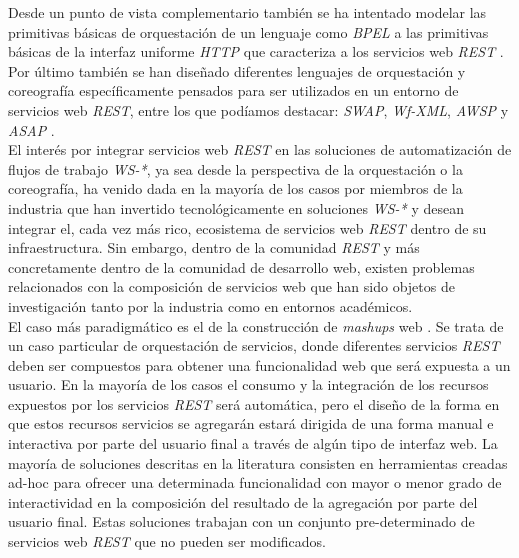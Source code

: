Desde un punto de vista complementario tambi\'en se ha intentado modelar las primitivas b\'asicas de orquestaci\'on de un lenguaje como \textit{BPEL} a las primitivas b\'asicas de la interfaz uniforme \textit{HTTP} que caracteriza a los servicios web \textit{REST} \cite{pautasso2010restful}.\\
Por \'ultimo tambi\'en se han dise\~nado diferentes lenguajes de orquestaci\'on y coreograf\'ia espec\'ificamente pensados para ser utilizados en un entorno de servicios web \textit{REST}, entre los que pod\'iamos destacar: \textit{SWAP}, \textit{Wf-XML}, \textit{AWSP} y \textit{ASAP} \cite{zur2005developing}.\\
El inter\'es por integrar servicios web \textit{REST} en las soluciones de automatizaci\'on de flujos de trabajo \textit{WS-*}, ya sea desde la perspectiva de la orquestaci\'on o la coreograf\'ia, ha venido dada en la mayor\'ia de los casos por miembros de la industria que han invertido tecnol\'ogicamente en soluciones \textit{WS-*} y desean integrar el, cada vez m\'as rico, ecosistema de servicios web \textit{REST} dentro de su infraestructura. Sin embargo, dentro de la comunidad \textit{REST} y m\'as concretamente dentro de la comunidad de desarrollo web, existen problemas relacionados con la composici\'on de servicios web que han sido objetos de investigaci\'on tanto por la industria como en entornos acad\'emicos.\\
El caso m\'as paradigm\'atico es el de la construcci\'on de \textit{mashups} web \cite{mashups}. Se trata de un caso particular de orquestaci\'on de servicios, donde diferentes servicios \textit{REST} deben ser compuestos para obtener una funcionalidad web que ser\'a expuesta a un usuario. En la mayor\'ia de los casos el consumo y la integraci\'on de los recursos expuestos por los servicios \textit{REST} ser\'a autom\'atica, pero el dise\~no de la forma en que estos recursos servicios se agregar\'an estar\'a dirigida de una forma manual e interactiva por parte del usuario final a trav\'es de alg\'un tipo de interfaz web.
La mayor\'ia de soluciones descritas en la literatura consisten en herramientas creadas ad-hoc para ofrecer una determinada funcionalidad con mayor o menor grado de interactividad en la composici\'on del resultado de la agregaci\'on por parte del usuario final. Estas soluciones trabajan con un conjunto pre-determinado de servicios web \textit{REST} que no pueden ser modificados.\\
